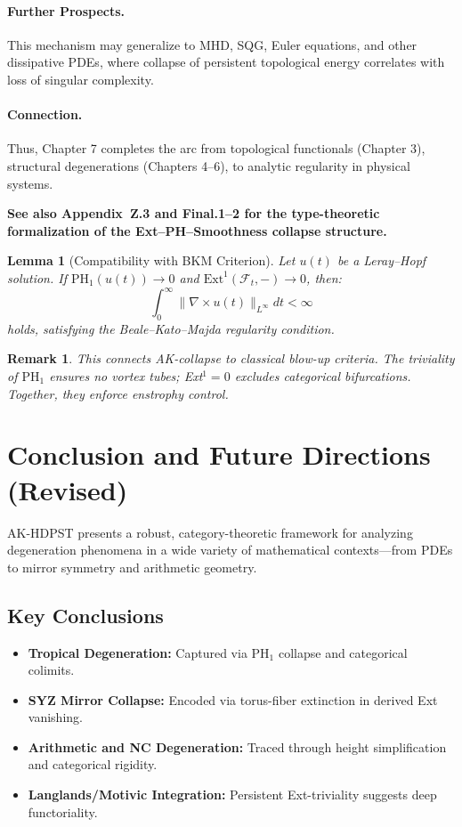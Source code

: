 \documentclass[11pt]{article}
\newtheorem{remark}[theorem]{Remark}
\newtheorem{lemma}[theorem]{Lemma}
\begin{document}
\paragraph{Further Prospects.}
This mechanism may generalize to MHD, SQG, Euler equations, and other dissipative PDEs, where collapse of persistent topological energy correlates with loss of singular complexity.

\paragraph{Connection.}
Thus, Chapter 7 completes the arc from topological functionals (Chapter 3), structural degenerations (Chapters 4–6), to analytic regularity in physical systems.

\textbf{See also Appendix~Z.3 and Final.1–2 for the type-theoretic formalization of the Ext–PH–Smoothness collapse structure.}


\begin{lemma}[Compatibility with BKM Criterion]
Let $u(t)$ be a Leray--Hopf solution. If $\mathrm{PH}_1(u(t)) \to 0$ and $\mathrm{Ext}^1(\mathcal{F}_t, -) \to 0$, then:
\[
\int_0^\infty \|\nabla \times u(t)\|_{L^\infty} dt < \infty
\]
holds, satisfying the Beale–Kato–Majda regularity condition.
\end{lemma}

\begin{remark}
This connects AK-collapse to classical blow-up criteria. The triviality of $\mathrm{PH}_1$ ensures no vortex tubes; Ext$^1 = 0$ excludes categorical bifurcations. Together, they enforce enstrophy control.
\end{remark}




\section{Conclusion and Future Directions (Revised)}

AK-HDPST presents a robust, category-theoretic framework for analyzing degeneration phenomena in a wide variety of mathematical contexts—from PDEs to mirror symmetry and arithmetic geometry.

\subsection*{Key Conclusions}
\begin{itemize}
    \item \textbf{Tropical Degeneration:} Captured via PH\(_1\) collapse and categorical colimits.
    \item \textbf{SYZ Mirror Collapse:} Encoded via torus-fiber extinction in derived Ext vanishing.
    \item \textbf{Arithmetic and NC Degeneration:} Traced through height simplification and categorical rigidity.
    \item \textbf{Langlands/Motivic Integration:} Persistent Ext-triviality suggests deep functoriality.
\end{itemize}
\end{document}
